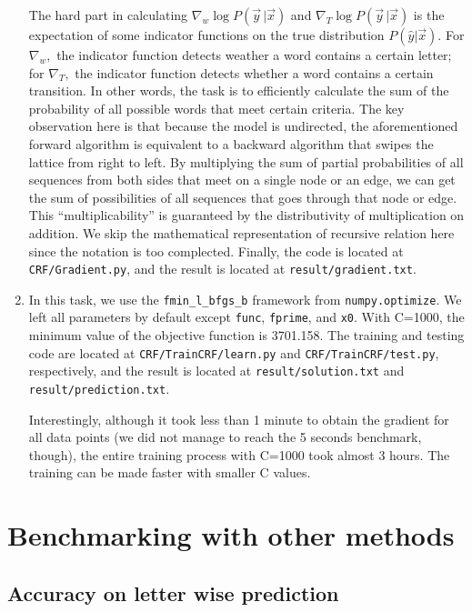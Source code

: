 \documentclass[11pt,a4paper]{article}
\begin{document}
\begin{enumerate}[label=(\alph*)]
The hard part in calculating $\nabla_w\log P(\vec{y}\,|\vec{x})$ and $\nabla_T\log P(\vec{y}\,|\vec{x})$ is the expectation of some indicator functions on the true distribution $P(\hat{y}|\vec{x}).$ For $\nabla_w,$ the indicator function detects weather a word contains a certain letter; for $\nabla_T,$ the indicator function detects whether a word contains a certain transition. In other words, the task is to efficiently calculate the sum of the probability of all possible words that meet certain criteria. The key observation here is that because the model is undirected, the aforementioned forward algorithm is equivalent to a backward algorithm that swipes the lattice from right to left. By multiplying the sum of partial probabilities of all sequences from both sides that meet on a single node or an edge, we can get the sum of possibilities of all sequences that goes through that node or edge. This ``multiplicability'' is guaranteed by the distributivity of multiplication on addition. We skip the mathematical representation of recursive relation here since the notation is too complected. Finally, the code is located at \texttt{CRF/Gradient.py}, and the result is located at \texttt{result/gradient.txt}.

\item
In this task, we use the \texttt{fmin\_l\_bfgs\_b} framework from \texttt{numpy.optimize}. We left all parameters by default except \texttt{func}, \texttt{fprime}, and \texttt{x0}. With C=1000, the minimum value of the objective function is 3701.158. The training and testing code are located at \texttt{CRF/TrainCRF/learn.py} and \texttt{CRF/TrainCRF/test.py}, respectively, and the result is located at \texttt{result/solution.txt} and \texttt{result/prediction.txt}.

Interestingly, although it took less than 1 minute to obtain the gradient for all data points (we did not manage to reach the 5 seconds benchmark, though), the entire training process with C=1000 took almost 3 hours. The training can be made faster with smaller C values.
\end{enumerate}

\section{Benchmarking with other methods}
\subsection{Accuracy on letter wise prediction}
\end{document}
